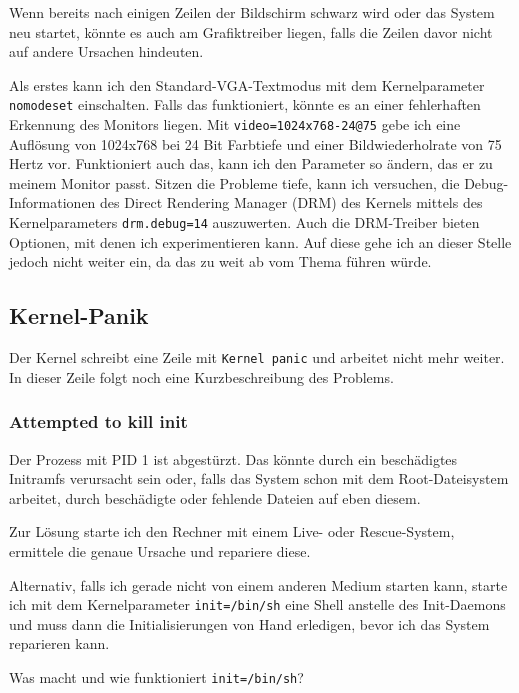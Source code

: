 Wenn bereits nach einigen Zeilen der Bildschirm schwarz wird oder das System
neu startet, könnte es auch am Grafiktreiber liegen, falls die Zeilen davor
nicht auf andere Ursachen hindeuten.

Als erstes kann ich den Standard-VGA-Textmodus mit dem Kernelparameter
\verb?nomodeset? einschalten. Falls das funktioniert, könnte es an einer
fehlerhaften Erkennung des Monitors liegen. Mit \verb?video=1024x768-24@75?
gebe ich eine Auflösung von 1024x768 bei 24 Bit Farbtiefe und einer
Bildwiederholrate von 75 Hertz vor. Funktioniert auch das, kann ich den
Parameter so ändern, das er zu meinem Monitor passt. Sitzen die Probleme
tiefe, kann ich versuchen, die Debug-Informationen des Direct Rendering
Manager (DRM) des Kernels mittels des Kernelparameters \verb?drm.debug=14?
auszuwerten. Auch die DRM-Treiber bieten Optionen, mit denen ich
experimentieren kann. Auf diese gehe ich an dieser Stelle jedoch nicht weiter
ein, da das zu weit ab vom Thema führen würde.

\subsection{Kernel-Panik}

Der Kernel schreibt eine Zeile mit \verb?Kernel panic? und arbeitet nicht mehr
weiter. In dieser Zeile folgt noch eine Kurzbeschreibung des Problems.

\subsubsection{Attempted to kill init}

Der Prozess mit PID 1 ist abgestürzt. Das könnte durch ein beschädigtes
Initramfs verursacht sein oder, falls das System schon mit dem
Root-Dateisystem arbeitet, durch beschädigte oder fehlende Dateien auf eben
diesem.

Zur Lösung starte ich den Rechner mit einem Live- oder Rescue-System,
ermittele die genaue Ursache und repariere diese.

Alternativ, falls ich gerade nicht von einem anderen Medium starten kann,
starte ich mit dem Kernelparameter \verb?init=/bin/sh? eine Shell anstelle des
Init-Daemons und muss dann die Initialisierungen von Hand erledigen, bevor ich
das System reparieren kann.

\begin{notes}
\item Was macht und wie funktioniert \verb!init=/bin/sh!?
\end{notes}

